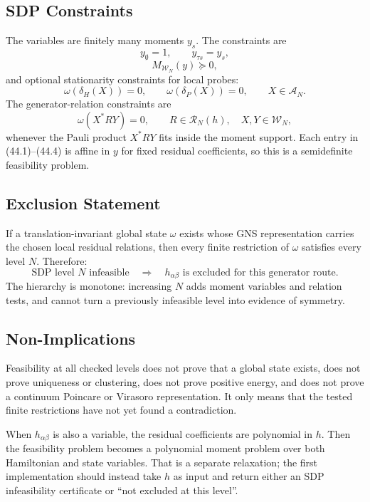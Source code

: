 \subsection{SDP Constraints}

The variables are finitely many moments \(y_s\).  The constraints are
\[
  y_{\emptyset}=1,\qquad y_{\tau s}=y_s,
  \tag{44.1}
\]
\[
  M_{\mathcal W_N}(y)\succeq0,
  \tag{44.2}
\]
and optional stationarity constraints for local probes:
\[
  \omega(\delta_H(X))=0,\qquad
  \omega(\delta_P(X))=0,
  \qquad X\in\mathcal A_N.
  \tag{44.3}
\]
The generator-relation constraints are
\[
  \omega(X^*RY)=0,
  \qquad
  R\in\mathcal R_N(h),\quad X,Y\in\mathcal W_N,
  \tag{44.4}
\]
whenever the Pauli product \(X^*RY\) fits inside the moment support.  Each
entry in (44.1)--(44.4) is affine in \(y\) for fixed residual coefficients, so
this is a semidefinite feasibility problem.

\subsection{Exclusion Statement}

If a translation-invariant global state \(\omega\) exists whose GNS
representation carries the chosen local residual relations, then every finite
restriction of \(\omega\) satisfies every level \(N\).  Therefore:
\[
  \text{SDP level }N\text{ infeasible}
  \quad\Longrightarrow\quad
  h_{\alpha\beta}\text{ is excluded for this generator route.}
  \tag{44.5}
\]
The hierarchy is monotone: increasing \(N\) adds moment variables and relation
tests, and cannot turn a previously infeasible level into evidence of symmetry.

\subsection{Non-Implications}

Feasibility at all checked levels does not prove that a global state exists,
does not prove uniqueness or clustering, does not prove positive energy, and
does not prove a continuum Poincare or Virasoro representation.  It only means
that the tested finite restrictions have not yet found a contradiction.

When \(h_{\alpha\beta}\) is also a variable, the residual coefficients are
polynomial in \(h\).  Then the feasibility problem becomes a polynomial moment
problem over both Hamiltonian and state variables.  That is a separate
relaxation; the first implementation should instead take \(h\) as input and
return either an SDP infeasibility certificate or ``not excluded at this
level''.

